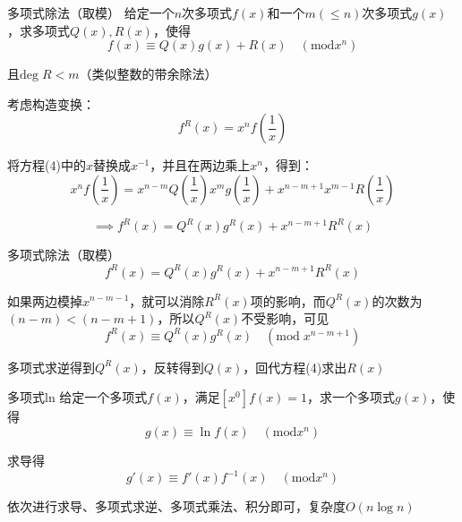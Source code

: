 \documentclass{beamer}
\begin{document}
\begin{frame}{多项式除法（取模）}
    \small
    给定一个$n$次多项式$f(x)$和一个$m(\leq n)$次多项式$g(x)$，求多项式$Q(x),R(x)$，使得
    \begin{equation}
        f(x) \equiv Q(x)g(x)+R(x) \quad (\text{mod} x^n)
    \end{equation}

    且$\text{deg}\;R<m$（类似整数的带余除法）

    \vspace{1em}\pause
    考虑构造变换：
    \begin{equation*}
        f^R(x)=x^{n}f\left(\frac{1}{x}\right)
    \end{equation*}

    \pause
    将方程(4)中的$x$替换成$x^{-1}$，并且在两边乘上$x^n$，得到：
    \begin{equation*}
        x^nf\left(\frac{1}{x}\right)=x^{n-m}Q\left(\frac{1}{x}\right)x^m g\left(\frac{1}{x}\right) + x^{n-m+1}x^{m-1}R\left(\frac{1}{x}\right)
    \end{equation*}

    \pause
    \begin{equation*}
        \implies f^R(x) = Q^R(x)g^R(x)+x^{n-m+1}R^R(x)
    \end{equation*}
\end{frame}

\begin{frame}{多项式除法（取模）}
    \small
    \begin{equation*}
        f^R(x) = Q^R(x)g^R(x)+x^{n-m+1}R^R(x)
    \end{equation*}

    如果两边模掉$x^{n-m-1}$，就可以消除$R^R(x)$项的影响，而$Q^R(x)$的次数为$(n-m)<(n-m+1)$，所以$Q^R(x)$不受影响\pause，可见
    \begin{equation*}
        f^R(x)\equiv Q^R(x)g^R(x)\quad (\text{mod}\; x^{n-m+1})
    \end{equation*}

    多项式求逆得到$Q^R(x)$，反转得到$Q(x)$，回代方程(4)求出$R(x)$
\end{frame}

\begin{frame}{多项式ln}
    \small
    给定一个多项式$f(x)$，满足$[x^0]f(x)=1$，求一个多项式$g(x)$，使得
    \begin{equation}
        g(x) \equiv \ln f(x) \quad (\text{mod} x^n)
    \end{equation}
    
    \vspace{1em}\pause
    求导得
    \begin{equation*}
        g'(x) \equiv f'(x)f^{-1}(x) \quad (\text{mod} x^n)
    \end{equation*}

    依次进行求导、多项式求逆、多项式乘法、积分即可，复杂度$O(n\log n)$
\end{frame}
\end{document}
